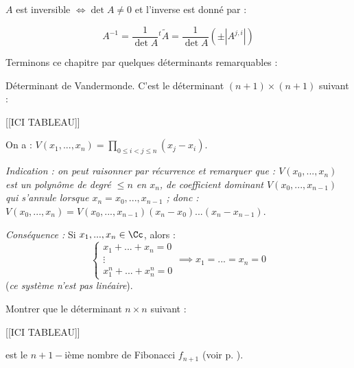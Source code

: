\documentclass[class=report,crop=false]{standalone}
\begin{document}
\begin{theoreme}
$A$ est inversible $\iff \det A \neq 0$ et l'inverse est donné par :

\[A^{-1} = \frac{1}{\det A} {}^t\tilde{A} = \frac{1}{\det A} \left(\pm |A^{j,i}|\right)\]
\end{theoreme}

Terminons ce chapitre par quelques déterminants remarquables :

\begin{exercicecours}
Déterminant de Vandermonde. C'est le déterminant $(n+1) \times (n+1)$ suivant :


[[ICI TABLEAU]]


On a : $V(x_1,...,x_n) = \prod_{0\le i < j \le n}(x_j-x_i)$.

{\it Indication : on peut raisonner par récurrence et remarquer que : $V(x_0,...,x_n)$ est un polynôme de degré $\le n$ en $x_n$, de coefficient dominant $V(x_0,...,x_{n-1})$ qui s'annule lorsque $x_n=x_0,...,x_{n-1}$ ; donc : $V(x_0,...,x_n) = V(x_0,...,x_{n-1})(x_n-x_0)...(x_n-x_{n-1})$}.

{\it Conséquence : }
Si $x_1,...,x_n \in \Cc$, alors :
\[\left\{ \begin{array}{c}
x_1 + ... + x_n= 0 \\
\vdots\\
x_1^{n} + ... + x_n^{n} = 0 
\end{array}\right. \implies x_1=...=x_n =0 \]
({\it ce système n'est pas linéaire}).
\end{exercicecours}


\begin{exercicecours}
Montrer que le déterminant $n \times n$ suivant :

[[ICI TABLEAU]]



est le $n+1-$ième nombre de Fibonacci $f_{n+1}$ (voir p. \pageref{fibo}).
\end{exercicecours}
\end{document}
